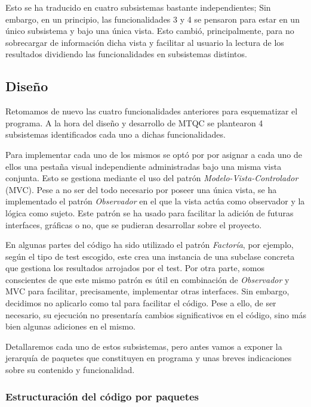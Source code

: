Esto se ha traducido en cuatro subsistemas bastante independientes; Sin embargo, en un principio, las funcionalidades 3 y 4 se pensaron para estar en un único subsistema y bajo una única vista. Esto cambió, principalmente, para no sobrecargar de información dicha vista y facilitar al usuario la lectura de los resultados dividiendo las funcionalidades en subsistemas distintos.

\subsection{Diseño}

Retomamos de nuevo las cuatro funcionalidades anteriores para esquematizar el programa. A la hora del diseño y desarrollo de MTQC se plantearon 4 subsistemas identificados cada uno a dichas funcionalidades.

Para implementar cada uno de los mismos se optó por por asignar a cada uno de ellos una pestaña visual independiente administradas bajo una misma vista conjunta. Esto se gestiona mediante el uso del patrón \textit{Modelo-Vista-Controlador} (MVC). Pese a no ser del todo necesario por poseer una única vista, se ha implementado el patrón \textit{Observador} en el que la vista actúa como observador y la lógica como sujeto. Este patrón se ha usado para facilitar la adición de futuras interfaces, gráficas o no, que se pudieran desarrollar sobre el proyecto.

En algunas partes del código ha sido utilizado el patrón \textit{Factoría}, por ejemplo, según el tipo de test escogido, este crea una instancia de una subclase concreta que gestiona los resultados arrojados por el test. Por otra parte, somos conscientes de que este mismo patrón es útil en combinación de \textit{Observador} y MVC para facilitar, precisamente, implementar otras interfaces. Sin embargo, decidimos no aplicarlo como tal para facilitar el código. Pese a ello, de ser necesario, su ejecución no presentaría cambios significativos en el código, sino más bien algunas adiciones en el mismo.

Detallaremos cada uno de estos subsistemas, pero antes vamos a exponer la jerarquía de paquetes que constituyen en programa y unas breves indicaciones sobre su contenido y funcionalidad.

\subsubsection{Estructuración del código por paquetes}

